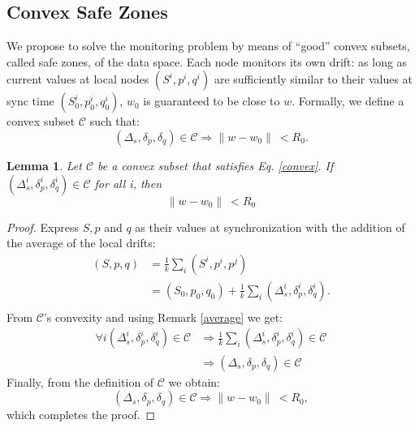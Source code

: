 \documentclass[11pt,twocolumn,varwidth=true,a4paper,fleqn]{article}
\newtheorem{lemma}{Lemma}
\begin{document}
\subsection{Convex Safe Zones}
We propose to solve the monitoring problem by means of
``good'' convex subsets, called safe zones, of the data space.
Each node monitors its own drift: as long as current values
at local nodes $(S^i,p^i,q^i)$ are sufficiently similar to their values
at sync time $(S^i_0,p^i_0,q^i_0)$, $w_0$ is guaranteed to be close to $w$.
Formally, we define a convex subset $\mathcal{C}$ such that:
\begin{equation} \label{convex}
(\Delta_s, \delta_p, \delta_q) \in \mathcal{C} \Rightarrow \parallel w-w_0
\parallel \ < R_0.
\end{equation}
\begin{lemma}
Let $\mathcal{C}$ be a convex subset that satisfies Eq. \ref{convex}.
If $(\Delta_s^i, \delta_p^i, \delta_q^i) \in \mathcal{C}$ for all i, then
\begin{equation*}
\parallel w-w_0 \parallel \ < R_0
\end{equation*}
\end{lemma}
\begin{proof}
Express $S, p$ and $q$ as their values at synchronization with the addition of the
average of the local drifts:
\begin{equation*} 
\begin{split}
(S,p,q) & = \frac{1}{k} \sum_i (S^i,p^i,p^j) \\
 & = (S_0,p_0,q_0) + \frac{1}{k} \sum_i (\Delta_s^i,\delta^i_p,\delta_q^i). \\
\end{split}
\end{equation*}
From $\mathcal{C}$'s convexity and using Remark \ref{average} we get:
\begin{equation*} 
\begin{split}
\forall i (\Delta_s^i,\delta^i_p,\delta_q^i) \in \mathcal{C} & \Rightarrow 
\frac{1}{k} \sum_i (\Delta_s^i,\delta^i_p,\delta_q^i) \in \mathcal{C} \\
& \Rightarrow (\Delta_s,\delta_p,\delta_q) \in \mathcal{C}
\end{split}
\end{equation*}
Finally, from the definition of $\mathcal{C}$ we obtain:
\begin{equation*}
(\Delta_s,\delta_p,\delta_q) \in \mathcal{C} \Rightarrow \parallel w-w_0
\parallel \ < R_0,
\end{equation*}
which completes the proof.
\end{proof}
\end{document}
